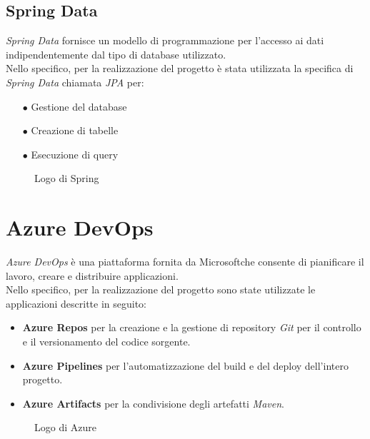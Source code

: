 \subsection{Spring Data}
\emph{Spring Data} fornisce un modello di programmazione per l’accesso ai dati indipendentemente dal tipo di database utilizzato.\\
Nello specifico, per la realizzazione del progetto è stata utilizzata la specifica di \emph{Spring Data} chiamata \emph{JPA} per:
\begin{itemize}
	\item[$\bullet$]Gestione del database
	\item[$\bullet$]Creazione di tabelle
	\item[$\bullet$]Esecuzione di query
\end{itemize}

\begin{figure}[ht]
	\centering
	\caption{Logo di Spring}
	\label{fig:one}
\end{figure}


\section{Azure DevOps}
\emph{Azure DevOps} è una piattaforma fornita da Microsoft\texttrademark che consente di pianificare il lavoro, creare e distribuire applicazioni.\\
Nello specifico, per la realizzazione del progetto sono state utilizzate le applicazioni descritte in seguito:
\begin{itemize}
	\item \textbf{Azure Repos} per la creazione e la gestione di repository \emph{Git} per il controllo e il versionamento del codice sorgente.
	\item \textbf{Azure Pipelines} per l’automatizzazione del build e del deploy dell’intero progetto.
	\item \textbf{Azure Artifacts} per la condivisione degli artefatti \emph{Maven}.
\end{itemize}
\begin{figure}[ht]
	\centering
	\caption{Logo di Azure}
	\label{fig:one}
\end{figure}
